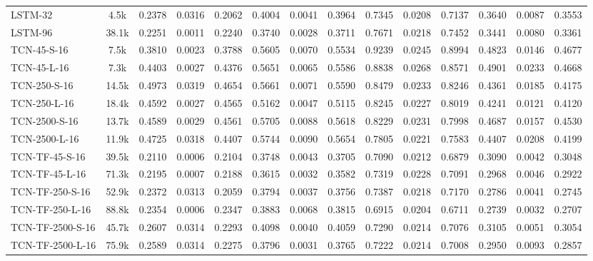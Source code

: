 \begin{table*}[h]
{\begin{tabular}{l c >{\columncolor{gray!20}}ccc >{\columncolor{gray!20}}ccc >{\columncolor{gray!20}}ccc >{\columncolor{gray!20}}ccc}
            \hline
            LSTM-32 & 4.5k & 0.2378 & 0.0316 & 0.2062 & 0.4004 & 0.0041 & 0.3964 & 0.7345 & 0.0208 & 0.7137 & 0.3640 & 0.0087 & 0.3553 \\
            LSTM-96 & 38.1k & 0.2251 & 0.0011 & 0.2240 & 0.3740 & 0.0028 & 0.3711 & 0.7671 & 0.0218 & 0.7452 & 0.3441 & 0.0080 & 0.3361 \\
            \hline
            TCN-45-S-16 & 7.5k & 0.3810 & 0.0023 & 0.3788 & 0.5605 & 0.0070 & 0.5534 & 0.9239 & 0.0245 & 0.8994 & 0.4823 & 0.0146 & 0.4677 \\
            TCN-45-L-16 & 7.3k & 0.4403 & 0.0027 & 0.4376 & 0.5651 & 0.0065 & 0.5586 & 0.8838 & 0.0268 & 0.8571 & 0.4901 & 0.0233 & 0.4668 \\
            TCN-250-S-16 & 14.5k & 0.4973 & 0.0319 & 0.4654 & 0.5661 & 0.0071 & 0.5590 & 0.8479 & 0.0233 & 0.8246 & 0.4361 & 0.0185 & 0.4175 \\
            TCN-250-L-16 & 18.4k & 0.4592 & 0.0027 & 0.4565 & 0.5162 & 0.0047 & 0.5115 & 0.8245 & 0.0227 & 0.8019 & 0.4241 & 0.0121 & 0.4120 \\
            TCN-2500-S-16 & 13.7k & 0.4589 & 0.0029 & 0.4561 & 0.5705 & 0.0088 & 0.5618 & 0.8229 & 0.0231 & 0.7998 & 0.4687 & 0.0157 & 0.4530 \\
            TCN-2500-L-16 & 11.9k & 0.4725 & 0.0318 & 0.4407 & 0.5744 & 0.0090 & 0.5654 & 0.7805 & 0.0221 & 0.7583 & 0.4407 & 0.0208 & 0.4199 \\ 
            \hline
            TCN-TF-45-S-16 & 39.5k & 0.2110 & 0.0006 & 0.2104 & 0.3748 & 0.0043 & 0.3705 & 0.7090 & 0.0212 & 0.6879 & 0.3090 & 0.0042 & 0.3048 \\
            TCN-TF-45-L-16 & 71.3k & 0.2195 & 0.0007 & 0.2188 & 0.3615 & 0.0032 & 0.3582 & 0.7319 & 0.0228 & 0.7091 & 0.2968 & 0.0046 & 0.2922 \\
            TCN-TF-250-S-16 & 52.9k & 0.2372 & 0.0313 & 0.2059 & 0.3794 & 0.0037 & 0.3756 & 0.7387 & 0.0218 & 0.7170 & 0.2786 & 0.0041 & 0.2745 \\
            TCN-TF-250-L-16 & 88.8k & 0.2354 & 0.0006 & 0.2347 & 0.3883 & 0.0068 & 0.3815 & 0.6915 & 0.0204 & 0.6711 & 0.2739 & 0.0032 & 0.2707 \\
            TCN-TF-2500-S-16 & 45.7k & 0.2607 & 0.0314 & 0.2293 & 0.4098 & 0.0040 & 0.4059 & 0.7290 & 0.0214 & 0.7076 & 0.3105 & 0.0051 & 0.3054 \\
            TCN-TF-2500-L-16 & 75.9k & 0.2589 & 0.0314 & 0.2275 & 0.3796 & 0.0031 & 0.3765 & 0.7222 & 0.0214 & 0.7008 & 0.2950 & 0.0093 & 0.2857 \\

\end{tabular}}
\end{table*}
